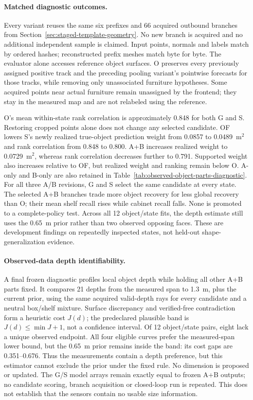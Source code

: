 \paragraph{Matched diagnostic outcomes.}
Every variant reuses the same six prefixes and 66 acquired outbound branches from Section~\ref{sec:staged-template-geometry}. No new branch is acquired and no additional independent sample is claimed. Input points, normals and labels match by ordered hashes; reconstructed prefix meshes match byte for byte. The evaluator alone accesses reference object surfaces. O preserves every previously assigned positive track and the preceding pooling variant's pointwise forecasts for those tracks, while removing only unassociated furniture hypotheses. Some acquired points near actual furniture remain unassigned by the frontend; they stay in the measured map and are not relabeled using the reference.



O's mean within-state rank correlation is approximately 0.848 for both G and S. Restoring cropped points alone does not change any selected candidate. OF lowers S's newly realized true-object prediction weight from 0.0857 to 0.0489~m$^2$ and rank correlation from 0.848 to 0.800. A+B increases realized weight to 0.0729~m$^2$, whereas rank correlation decreases further to 0.791. Supported weight also increases relative to OF, but realized weight and ranking remain below O. A-only and B-only are also retained in Table~\ref{tab:observed-object-parts-diagnostic}. For all three A/B revisions, G and S select the same candidate at every state. The selected A+B branches trade more object recovery for less global recovery than O; their mean shelf recall rises while cabinet recall falls. None is promoted to a complete-policy test. Across all 12 object/state fits, the depth estimate still uses the 0.65~m prior rather than two observed opposing faces. These are development findings on repeatedly inspected states, not held-out shape-generalization evidence.


\paragraph{Observed-data depth identifiability.}
A final frozen diagnostic profiles local object depth while holding all other A+B parts fixed. It compares 21 depths from the measured span to 1.3~m, plus the current prior, using the same acquired valid-depth rays for every candidate and a neutral box/shelf mixture. Surface discrepancy and verified-free contradiction form a heuristic cost $J(d)$; the predeclared plausible band is $J(d)\leq\min J+1$, not a confidence interval. Of 12 object/state pairs, eight lack a unique observed endpoint. All four eligible curves prefer the measured-span lower bound, but the 0.65~m prior remains inside the band: its cost gaps are 0.351--0.676. Thus the measurements contain a depth preference, but this estimator cannot exclude the prior under the fixed rule. No dimension is proposed or updated. The G/S model arrays remain exactly equal to frozen A+B outputs; no candidate scoring, branch acquisition or closed-loop run is repeated. This does not establish that the sensors contain no usable size information.

